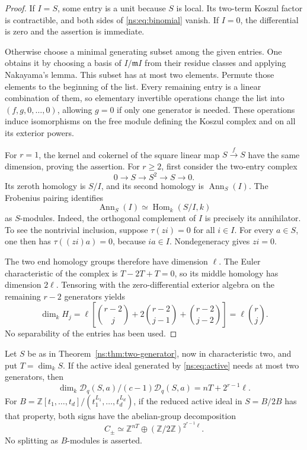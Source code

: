 \begin{proof}
If $I=S$, some entry is a unit because $S$ is local. Its two-term Koszul
factor is contractible, and both sides of \eqref{ns:eq:binomial} vanish.
If $I=0$, the differential is zero and the assertion is immediate.

Otherwise choose a minimal generating subset among the given entries.
One obtains it by choosing a basis of $I/\mathfrak mI$ from their residue
classes and applying Nakayama's lemma. This subset has at most two elements.
Permute those elements to the beginning of the list. Every remaining entry
is a linear combination of them, so elementary invertible operations change
the list into $(f,g,0,\ldots,0)$, allowing $g=0$ if only one generator is
needed. These operations induce isomorphisms on the free module defining
the Koszul complex and on all its exterior powers.

For $r=1$, the kernel and cokernel of the square linear map
$S\xrightarrow{f}S$ have the same dimension, proving the assertion. For
$r\ge2$, first consider the two-entry complex
\[
 0\longrightarrow S\longrightarrow S^2\longrightarrow S\longrightarrow0.
\]
Its zeroth homology is $S/I$, and its second homology is
$\operatorname{Ann}_S(I)$. The Frobenius pairing identifies
\begin{equation}\label{ns:eq:dual}
 \operatorname{Ann}_S(I)\simeq\operatorname{Hom}_k(S/I,k)
\end{equation}
as $S$-modules. Indeed, the orthogonal complement of $I$ is precisely its
annihilator. To see the nontrivial inclusion, suppose $\tau(zi)=0$ for
all $i\in I$. For every $a\in S$, one then has $\tau((zi)a)=0$, because
$ia\in I$. Nondegeneracy gives $zi=0$.

The two end homology groups therefore have dimension $\ell$. The Euler
characteristic of the complex is $T-2T+T=0$, so its middle homology has
dimension $2\ell$. Tensoring with the zero-differential exterior algebra
on the remaining $r-2$ generators yields
\[
 \dim_kH_j
 =\ell\left[\binom{r-2}j+2\binom{r-2}{j-1}
                  +\binom{r-2}{j-2}\right]
 =\ell\binom rj.
\]
No separability of the entries has been used.
\end{proof}

\begin{corollary}\label{ns:cor:reflection}
Let $S$ be as in Theorem~\ref{ns:thm:two-generator}, now in characteristic
two, and put $T=\dim_kS$. If the active ideal generated by
\eqref{ns:eq:active} needs at most two generators, then
\begin{equation}\label{ns:eq:reflection}
 \dim_k\mathcal D_q(S,a)/(c-1)\mathcal D_q(S,a)
 =nT+2^{r-1}\ell.
\end{equation}
For
$B=\mathbb Z[t_1,\ldots,t_d]/(t_1^{L_1},\ldots,t_d^{L_d})$, if the reduced
active ideal in $S=B/2B$ has that property, both signs have the abelian-group
decomposition
\begin{equation}\label{ns:eq:smith}
 C_\pm\simeq\mathbb Z^{nT}\oplus
                  (\mathbb Z/2\mathbb Z)^{2^{r-1}\ell}.
\end{equation}
No splitting as $B$-modules is asserted.
\end{corollary}

